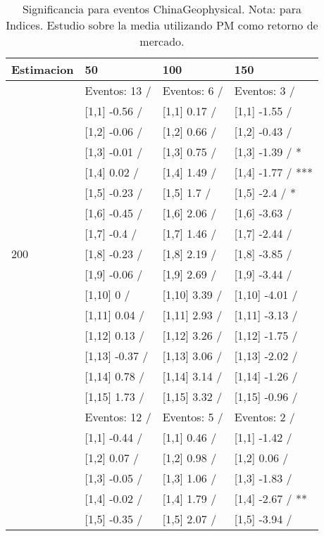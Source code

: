 \begin{table}

\caption{Significancia para eventos ChinaGeophysical. Nota: para Indices. Estudio sobre la media utilizando PM como retorno de mercado.}
\centering
\begin{tabular}[t]{llll}
\toprule
Estimacion & 50 & 100 & 150\\
\midrule
 & Eventos:  13 / & Eventos:  6 / & Eventos:  3 /\\
 & {}[1,1] -0.56  / & {}[1,1] 0.17  / & {}[1,1] -1.55  /\\
 & {}[1,2] -0.06  / & {}[1,2] 0.66  / & {}[1,2] -0.43  /\\
 & {}[1,3] -0.01  / & {}[1,3] 0.75  / & {}[1,3] -1.39  / *\\
 & {}[1,4] 0.02  / & {}[1,4] 1.49  / & {}[1,4] -1.77  / ***\\
\addlinespace
 & {}[1,5] -0.23  / & {}[1,5] 1.7  / & {}[1,5] -2.4  / *\\
 & {}[1,6] -0.45  / & {}[1,6] 2.06  / & {}[1,6] -3.63  /\\
 & {}[1,7] -0.4  / & {}[1,7] 1.46  / & {}[1,7] -2.44  /\\
200 & {}[1,8] -0.23  / & {}[1,8] 2.19  / & {}[1,8] -3.85  /\\
 & {}[1,9] -0.06  / & {}[1,9] 2.69  / & {}[1,9] -3.44  /\\
\addlinespace
 & {}[1,10] 0  / & {}[1,10] 3.39  / & {}[1,10] -4.01  /\\
 & {}[1,11] 0.04  / & {}[1,11] 2.93  / & {}[1,11] -3.13  /\\
 & {}[1,12] 0.13  / & {}[1,12] 3.26  / & {}[1,12] -1.75  /\\
 & {}[1,13] -0.37  / & {}[1,13] 3.06  / & {}[1,13] -2.02  /\\
 & {}[1,14] 0.78  / & {}[1,14] 3.14  / & {}[1,14] -1.26  /\\
\addlinespace
 & {}[1,15] 1.73  / & {}[1,15] 3.32  / & {}[1,15] -0.96  /\\
 & Eventos:  12 / & Eventos:  5 / & Eventos:  2 /\\
 & {}[1,1] -0.44  / & {}[1,1] 0.46  / & {}[1,1] -1.42  /\\
 & {}[1,2] 0.07  / & {}[1,2] 0.98  / & {}[1,2] 0.06  /\\
 & {}[1,3] -0.05  / & {}[1,3] 1.06  / & {}[1,3] -1.83  /\\
\addlinespace
 & {}[1,4] -0.02  / & {}[1,4] 1.79  / & {}[1,4] -2.67  / **\\
 & {}[1,5] -0.35  / & {}[1,5] 2.07  / & {}[1,5] -3.94  /\\

\end{tabular}
\end{table}
